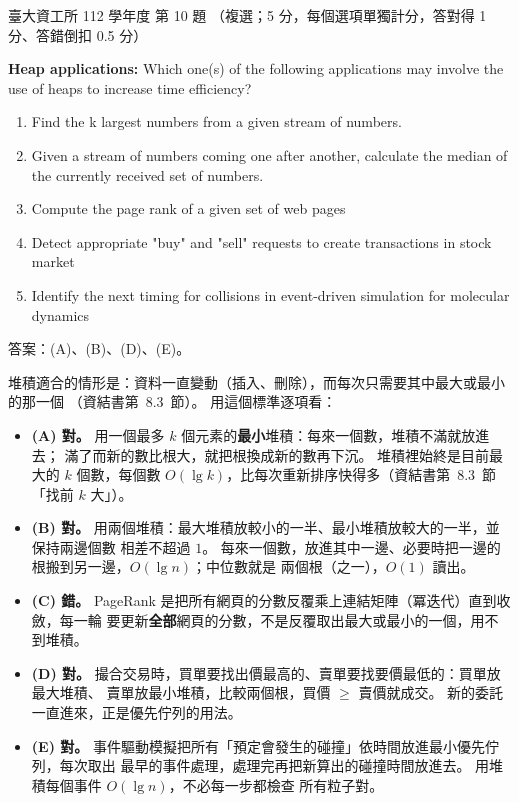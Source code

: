 \begin{pastexam}[label={px:ntu-112-dsa-10}]{臺大資工所 112 學年度 第 10 題}
（複選；5 分，每個選項單獨計分，答對得 1 分、答錯倒扣 0.5 分）

\textbf{Heap applications:} Which one(s) of the following applications may involve the use of heaps
to increase time efficiency?
\begin{enumerate}[label=(\Alph*)]
\item Find the k largest numbers from a given stream of numbers.
\item Given a stream of numbers coming one after another, calculate the median of the currently
received set of numbers.
\item Compute the page rank of a given set of web pages
\item Detect appropriate "buy" and "sell" requests to create transactions in stock market
\item Identify the next timing for collisions in event-driven simulation for molecular dynamics
\end{enumerate}
\end{pastexam}

\begin{pastsoln}
答案：(A)、(B)、(D)、(E)。

堆積適合的情形是：資料一直變動（插入、刪除），而每次只需要其中最大或最小的那一個
（資結書第~8.3~節）。 用這個標準逐項看：
\begin{itemize}
\item \textbf{(A) 對。} 用一個最多 $k$ 個元素的\textbf{最小}堆積：每來一個數，堆積不滿就放進去；
滿了而新的數比根大，就把根換成新的數再下沉。 堆積裡始終是目前最大的 $k$ 個數，每個數
$O(\lg k)$，比每次重新排序快得多（資結書第~8.3~節「找前 $k$ 大」）。
\item \textbf{(B) 對。} 用兩個堆積：最大堆積放較小的一半、最小堆積放較大的一半，並保持兩邊個數
相差不超過 $1$。 每來一個數，放進其中一邊、必要時把一邊的根搬到另一邊，$O(\lg n)$；中位數就是
兩個根（之一），$O(1)$ 讀出。
\item \textbf{(C) 錯。} PageRank 是把所有網頁的分數反覆乘上連結矩陣（冪迭代）直到收斂，每一輪
要更新\textbf{全部}網頁的分數，不是反覆取出最大或最小的一個，用不到堆積。
\item \textbf{(D) 對。} 撮合交易時，買單要找出價最高的、賣單要找要價最低的：買單放最大堆積、
賣單放最小堆積，比較兩個根，買價 $\ge$ 賣價就成交。 新的委託一直進來，正是優先佇列的用法。
\item \textbf{(E) 對。} 事件驅動模擬把所有「預定會發生的碰撞」依時間放進最小優先佇列，每次取出
最早的事件處理，處理完再把新算出的碰撞時間放進去。 用堆積每個事件 $O(\lg n)$，不必每一步都檢查
所有粒子對。
\end{itemize}
\end{pastsoln}
